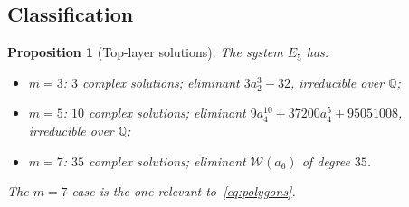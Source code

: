 \documentclass[a4paper,11pt]{article}
\theoremstyle{plain}
\newtheorem{proposition}[theorem]{Proposition}
\theoremstyle{definition}
\theoremstyle{remark}
\begin{document}
\subsection{Classification}

\begin{proposition}[Top-layer solutions]\label{prop:top-class}
The system $E_5$ has:
\begin{itemize}[nosep]
\item $m=3$: $3$ complex solutions; eliminant $3a_2^3-32$, irreducible over $\mathbb{Q}$;
\item $m=5$: $10$ complex solutions; eliminant $9a_4^{10}+37200a_4^5+95051008$, irreducible over $\mathbb{Q}$;
\item $m=7$: $35$ complex solutions; eliminant $\mathcal{W}(a_6)$ of degree $35$.
\end{itemize}
The $m=7$ case is the one relevant to~\eqref{eq:polygons}.
\end{proposition}
\end{document}
